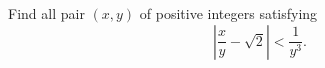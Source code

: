 Find all pair $(x,y)$ of positive integers satisfying $$\left|\frac{x}{y}-\sqrt2\right|<\frac{1}{y^3}.$$